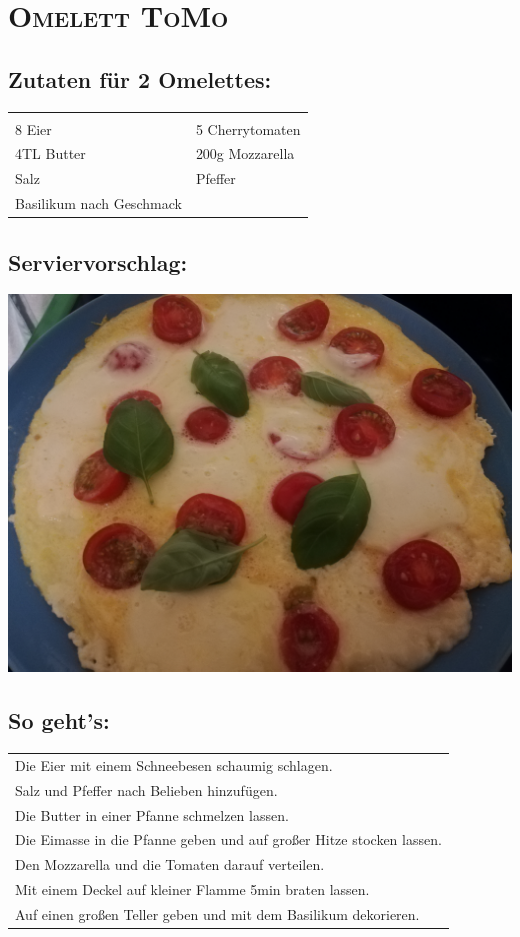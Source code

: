 \section{\textsc{Omelett ToMo}}

\subsection*{Zutaten für 2 Omelettes:}

\begin{tabular}{p{7.5cm} p{7.5cm}}
	& \\
	8 Eier & 5 Cherrytomaten \\
	4TL Butter & 200g Mozzarella \\
	Salz & Pfeffer \\
	Basilikum nach Geschmack &
\end{tabular}

\subsection*{Serviervorschlag:}

\includegraphics[width=\textwidth]{img/omlett/omlett_tomo_fertig.jpg} \cite{omlettomo}

\subsection*{So geht's:}

\begin{tabular}{p{15cm}}
	\\
	Die Eier mit einem Schneebesen schaumig schlagen.\\
	Salz und Pfeffer nach Belieben hinzufügen.\\
	Die Butter in einer Pfanne schmelzen lassen.\\
	Die Eimasse in die Pfanne geben und auf großer Hitze stocken lassen.\\
	Den Mozzarella und die Tomaten darauf verteilen.\\
	Mit einem Deckel auf kleiner Flamme 5min braten lassen.\\
	Auf einen großen Teller geben und mit dem Basilikum dekorieren.\\
\end{tabular}
